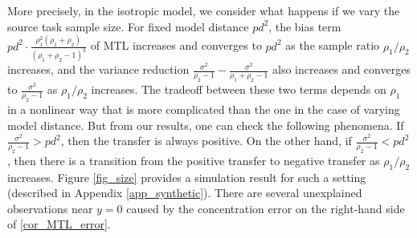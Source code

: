 \begin{example}[Sample ratio]



More precisely, in the isotropic model, we consider what happens if we vary the source task sample size. For fixed model distance $pd^2$, the bias term $  pd^2\cdot \frac{\rho_1^2 (\rho_1+\rho_2)}{(\rho_1 + \rho_2 - 1)^3}$ of MTL increases and converges to $pd^2$ as the sample ratio $\rho_1/\rho_2$ increases, and the variance reduction $\frac{\sigma^2}{ \rho_2-1}  -\frac{\sigma^2}{\rho_1+\rho_2-1}$ also increases and converges to $\frac{\sigma^2}{\rho_2-1}$ as $\rho_1/\rho_2$ increases. The tradeoff between these two terms depends on $\rho_1$ in a nonlinear way that is more complicated than the one in the case of varying model distance. But from our results, one can check the following phenomena. If $\frac{\sigma^2}{\rho_2-1} > pd^2$, then the transfer is always positive. On the other hand, if $\frac{\sigma^2}{\rho_2-1} < pd^2$, then there is a transition from the positive transfer to negative transfer as $\rho_1/\rho_2$ increases.
Figure \ref{fig_size} provides a simulation result for such a setting (described in Appendix \ref{app_synthetic}).
There are several unexplained observations near $y = 0$ caused by the concentration error on the right-hand side of \eqref{cor_MTL_error}.
\end{example}

